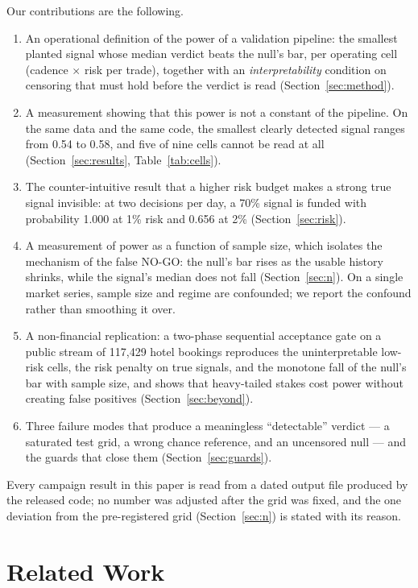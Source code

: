 \documentclass[11pt]{article}
\begin{document}
Our contributions are the following.
\begin{enumerate}
\item An operational definition of the power of a validation pipeline: the smallest planted signal whose median verdict beats the null's bar, per operating cell (cadence $\times$ risk per trade), together with an \emph{interpretability} condition on censoring that must hold before the verdict is read (Section~\ref{sec:method}).
\item A measurement showing that this power is not a constant of the pipeline. On the same data and the same code, the smallest clearly detected signal ranges from 0.54 to 0.58, and five of nine cells cannot be read at all (Section~\ref{sec:results}, Table~\ref{tab:cells}).
\item The counter-intuitive result that a higher risk budget makes a strong true signal invisible: at two decisions per day, a 70\% signal is funded with probability 1.000 at 1\% risk and 0.656 at 2\% (Section~\ref{sec:risk}).
\item A measurement of power as a function of sample size, which isolates the mechanism of the false NO-GO: the null's bar rises as the usable history shrinks, while the signal's median does not fall (Section~\ref{sec:n}). On a single market series, sample size and regime are confounded; we report the confound rather than smoothing it over.
\item A non-financial replication: a two-phase sequential acceptance gate on a public stream of 117,429 hotel bookings reproduces the uninterpretable low-risk cells, the risk penalty on true signals, and the monotone fall of the null's bar with sample size, and shows that heavy-tailed stakes cost power without creating false positives (Section~\ref{sec:beyond}).
\item Three failure modes that produce a meaningless ``detectable'' verdict --- a saturated test grid, a wrong chance reference, and an uncensored null --- and the guards that close them (Section~\ref{sec:guards}).
\end{enumerate}

Every campaign result in this paper is read from a dated output file produced by the released code; no number was adjusted after the grid was fixed, and the one deviation from the pre-registered grid (Section~\ref{sec:n}) is stated with its reason.

\section{Related Work}
\label{sec:related}

\end{document}
